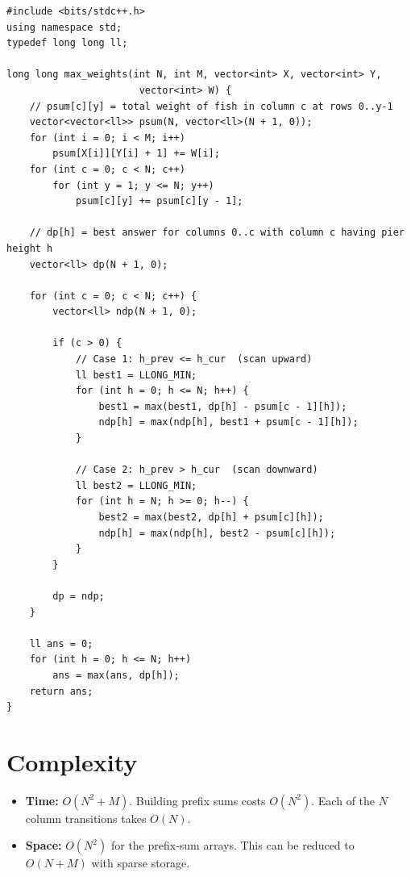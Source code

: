 \documentclass[11pt,a4paper]{article}
\begin{document}
\begin{lstlisting}
#include <bits/stdc++.h>
using namespace std;
typedef long long ll;

long long max_weights(int N, int M, vector<int> X, vector<int> Y,
                       vector<int> W) {
    // psum[c][y] = total weight of fish in column c at rows 0..y-1
    vector<vector<ll>> psum(N, vector<ll>(N + 1, 0));
    for (int i = 0; i < M; i++)
        psum[X[i]][Y[i] + 1] += W[i];
    for (int c = 0; c < N; c++)
        for (int y = 1; y <= N; y++)
            psum[c][y] += psum[c][y - 1];

    // dp[h] = best answer for columns 0..c with column c having pier height h
    vector<ll> dp(N + 1, 0);

    for (int c = 0; c < N; c++) {
        vector<ll> ndp(N + 1, 0);

        if (c > 0) {
            // Case 1: h_prev <= h_cur  (scan upward)
            ll best1 = LLONG_MIN;
            for (int h = 0; h <= N; h++) {
                best1 = max(best1, dp[h] - psum[c - 1][h]);
                ndp[h] = max(ndp[h], best1 + psum[c - 1][h]);
            }

            // Case 2: h_prev > h_cur  (scan downward)
            ll best2 = LLONG_MIN;
            for (int h = N; h >= 0; h--) {
                best2 = max(best2, dp[h] + psum[c][h]);
                ndp[h] = max(ndp[h], best2 - psum[c][h]);
            }
        }

        dp = ndp;
    }

    ll ans = 0;
    for (int h = 0; h <= N; h++)
        ans = max(ans, dp[h]);
    return ans;
}
\end{lstlisting}

\section{Complexity}

\begin{itemize}
  \item \textbf{Time:} $O(N^2 + M)$.  Building prefix sums costs $O(N^2)$.
        Each of the $N$ column transitions takes $O(N)$.
  \item \textbf{Space:} $O(N^2)$ for the prefix-sum arrays.
        This can be reduced to $O(N + M)$ with sparse storage.
\end{itemize}
\end{document}
